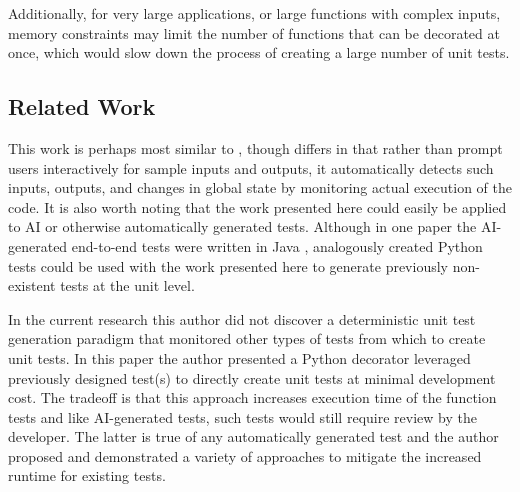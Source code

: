 Additionally, for very large applications, or large
functions with complex inputs, memory constraints may 
limit the number of functions that can be decorated at once,
which would slow down the process of creating 
a large number of unit tests.

\subsection{Related Work}\label{sec:related-work}
This work is perhaps most similar to 
\cite{lahiri2023interactivecodegenerationtestdriven}, though
differs in that rather than prompt users interactively for sample inputs and
outputs, it automatically detects such inputs, outputs, and changes in global
state by monitoring actual execution of the code.  It is also worth noting 
that the work presented here could easily be applied to AI or otherwise 
automatically generated tests.  Although in one paper the AI-generated end-to-end tests 
were written in Java \cite{leotta2024ai}, analogously created Python tests could
be used with the work presented here to generate previously non-existent 
tests at the unit level.

In the current research this author did not discover a deterministic 
unit test generation paradigm that monitored other types of
tests from which to create unit tests.  In this paper the author presented
a Python decorator leveraged previously designed test(s) to directly create 
unit tests at minimal development cost.
The tradeoff is that this approach increases execution time of the function 
tests and like AI-generated tests, such tests would still require review by the 
developer. The latter is true of any automatically generated test and 
the author proposed and demonstrated a variety of approaches to 
mitigate the increased runtime for existing tests.
